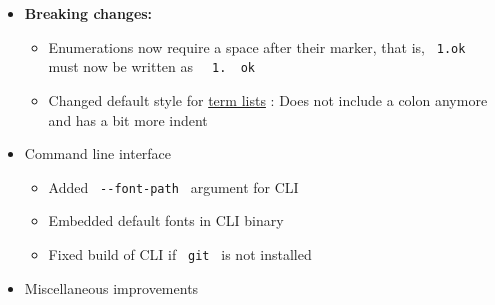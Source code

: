 \begin{itemize}
\item
  \textbf{Breaking changes:}

  \begin{itemize}
  \tightlist
  \item
    Enumerations now require a space after their marker, that is,
    \texttt{\ 1.ok\ } must now be written as
    \texttt{\ }{\texttt{\ 1.\ }}\texttt{\ ok\ }
  \item
    Changed default style for \href{/docs/reference/model/terms/}{term
    lists} : Does not include a colon anymore and has a bit more indent
  \end{itemize}
\item
  Command line interface

  \begin{itemize}
  \tightlist
  \item
    Added \texttt{\ -\/-font-path\ } argument for CLI
  \item
    Embedded default fonts in CLI binary
  \item
    Fixed build of CLI if \texttt{\ git\ } is not installed
  \end{itemize}
\item
  Miscellaneous improvements


\end{itemize}
